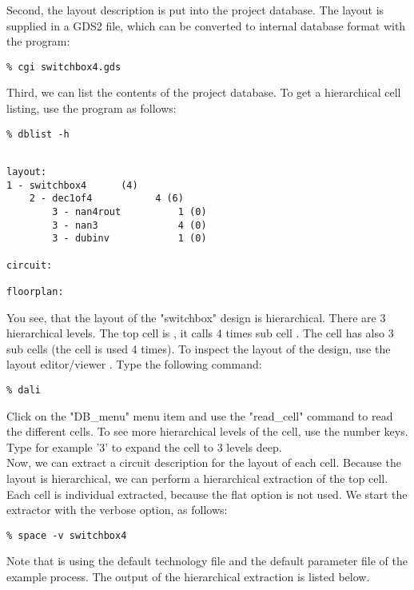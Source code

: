 Second, the layout description is put into the project database.
The layout is supplied in a GDS2 file, which can be converted to
internal database format with the  program:
\small
\begin{Verbatim}
% cgi switchbox4.gds
\end{Verbatim}
\normalsize
Third, we can list the contents of the project database.
To get a hierarchical cell listing, use the  program as follows:
\small
\begin{Verbatim}
% dblist -h
\end{Verbatim}
\normalsize
\small \begin{Verbatim}[frame=single]

layout:
1 - switchbox4      (4)
    2 - dec1of4           4 (6)
        3 - nan4rout          1 (0)
        3 - nan3              4 (0)
        3 - dubinv            1 (0)

circuit:

floorplan:

\end{Verbatim}
\normalsize
You see, that the layout of the "switchbox" design is hierarchical.
There are 3 hierarchical levels.
The top cell is , it calls 4 times sub cell .
The cell  has also 3 sub cells (the cell  is used 4 times).
To inspect the layout of the design, use the layout editor/viewer .
Type the following command:
\small
\begin{Verbatim}
% dali
\end{Verbatim}
\normalsize
Click on the "DB\_menu" menu item and use the "read\_cell" command
to read the different cells.
To see more hierarchical levels of the cell, use the number keys.
Type for example '3' to expand the cell to 3 levels deep.
\\[1 ex]
Now, we can extract a circuit description for the layout of each cell.
Because the layout is hierarchical,
we can perform a hierarchical extraction of the  top cell.
Each cell is individual extracted, because the flat option is not used.
We start the extractor with the verbose option, as follows:
\small
\begin{Verbatim}
% space -v switchbox4
\end{Verbatim}
\normalsize
Note that  is using the default technology file  and
the default parameter file  of the  example process.
The output of the hierarchical extraction is listed below.

